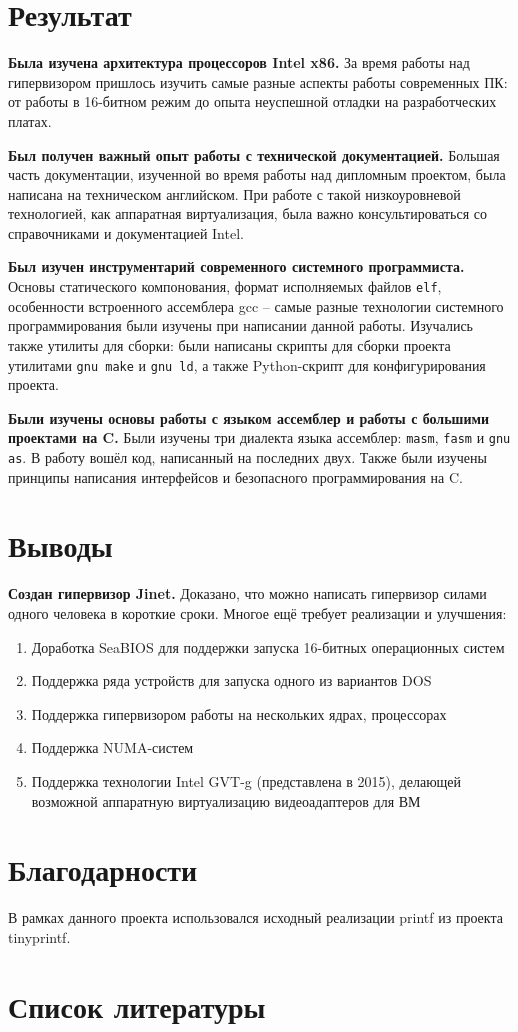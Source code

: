 \documentclass[a4paper,11pt]{extarticle}
\begin{document}
	\section{Результат}
	\textbf{Была изучена архитектура процессоров Intel x86.} За время работы над гипервизором пришлось изучить самые разные аспекты работы современных ПК: от работы в 16-битном режим до опыта неуспешной отладки на разработческих платах.\par
	\textbf{Был получен важный опыт работы с технической документацией.} Большая часть документации, изученной во время работы над дипломным проектом, была написана на техническом английском. При работе с такой низкоуровневой технологией, как аппаратная виртуализация, была важно консультироваться со справочниками и документацией Intel.\par
	\textbf{Был изучен инструментарий современного системного программиста.} Основы статического компонования, формат исполняемых файлов \texttt{elf}, особенности встроенного ассемблера gcc -- самые разные технологии системного программирования были изучены при написании данной работы. Изучались также утилиты для сборки: были написаны скрипты для сборки проекта утилитами \texttt{gnu make} и \texttt{gnu ld}, а также Python-скрипт для конфигурирования проекта.\par
	\textbf{Были изучены основы работы с языком ассемблер и работы с большими проектами на C.} Были изучены три диалекта языка ассемблер: \texttt{masm}, \texttt{fasm} и \texttt{gnu as}. В работу вошёл код, написанный на последних двух. Также были изучены принципы написания интерфейсов и безопасного программирования на C.\par
	\section{Выводы}
	\textbf{Создан гипервизор Jinet.} Доказано, что можно написать гипервизор силами одного человека в короткие сроки. Многое ещё требует реализации и улучшения:
	\begin{enumerate}
		\item Доработка SeaBIOS для поддержки запуска 16-битных операционных систем
		\item Поддержка ряда устройств для запуска одного из вариантов DOS
		\item Поддержка гипервизором работы на нескольких ядрах, процессорах
		\item Поддержка NUMA-систем
		\item Поддержка технологии Intel GVT-g (представлена в 2015), делающей возможной аппаратную виртуализацию видеоадаптеров для ВМ
	\end{enumerate}
	\section{Благодарности}
	В рамках данного проекта использовался исходный реализации printf из проекта tinyprintf.
	\section{Список литературы}
	\nocite{*}
	\renewcommand{\section}[2]{}%
	
	
\end{document}
